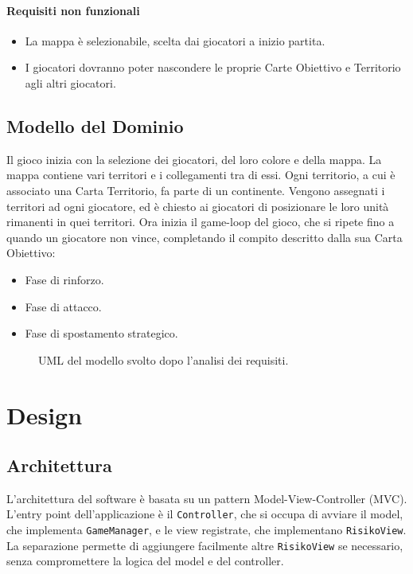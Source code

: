 \documentclass[a4paper,12pt]{report}
\begin{document}
\subsubsection{Requisiti non funzionali}
\begin{itemize}
	\item La mappa è selezionabile, scelta dai giocatori a inizio partita.
	\item I giocatori dovranno poter nascondere le proprie Carte Obiettivo e Territorio agli altri giocatori.
\end{itemize}

\section{Modello del Dominio}

Il gioco inizia con la selezione dei giocatori, del loro colore e della mappa.
La mappa contiene vari territori e i collegamenti tra di essi. Ogni territorio, a cui è associato una Carta Territorio, fa parte di un continente.
Vengono assegnati i territori ad ogni giocatore, ed è chiesto ai giocatori di posizionare le loro unità rimanenti in quei territori.
Ora inizia il game-loop del gioco, che si ripete fino a quando un giocatore non vince, completando il compito descritto dalla sua Carta Obiettivo:
\begin{itemize}
	\item Fase di rinforzo.
	\item Fase di attacco.
	\item Fase di spostamento strategico.
\end{itemize}

\begin{figure}[H]
	\centering
	
	\caption{UML del modello svolto dopo l'analisi dei requisiti.}
\end{figure}

\chapter{Design}

\section{Architettura}

L'architettura del software è basata su un pattern Model-View-Controller (MVC).
L'entry point dell'applicazione è il \texttt{Controller}, che si occupa di avviare il model, che implementa \texttt{GameManager}, e le view registrate, che implementano \texttt{RisikoView}.
La separazione permette di aggiungere facilmente altre \texttt{RisikoView} se necessario, senza compromettere la logica del model e del controller.
\end{document}
